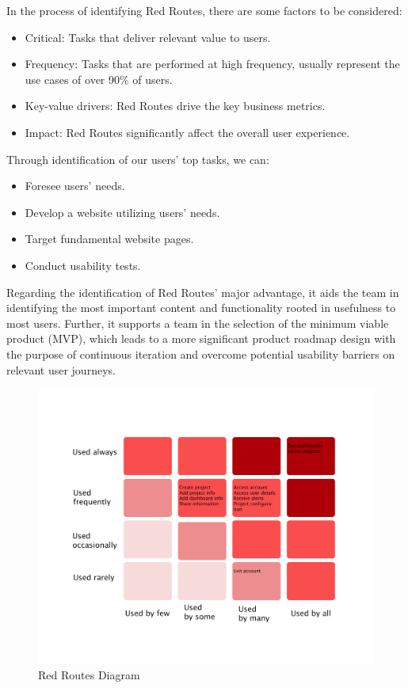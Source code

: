 \documentclass[a4paper,twoside,10pt]{report}
\begin{document}
In the process of identifying Red Routes, there are some factors to be considered:
\begin{itemize}
	\item Critical: Tasks that deliver relevant value to users.
 	\item Frequency: Tasks that are performed at high frequency, usually represent the use cases of over 90\% of users.
 	\item Key-value drivers: Red Routes drive the key business metrics.
 	\item Impact: Red Routes significantly affect the overall user experience.
\end{itemize}
Through identification of our users' top tasks, we can:
\begin{itemize}
	\item Foresee users' needs.
	\item Develop a website utilizing users' needs.
	\item Target fundamental website pages.
	\item Conduct usability tests.
\end{itemize}	
Regarding the identification of Red Routes' major advantage, it aids the team in identifying the most important content and functionality rooted in usefulness to most users. Further, it supports a team in the selection of the minimum viable product (MVP), which leads to a more significant product roadmap design with the purpose of continuous iteration and overcome potential usability barriers on relevant user journeys. 
\begin{figure}[h!]
\center
  \includegraphics[width=\textwidth]{red-routes.png}
\caption{Red Routes Diagram}
\end{figure}
\end{document}
